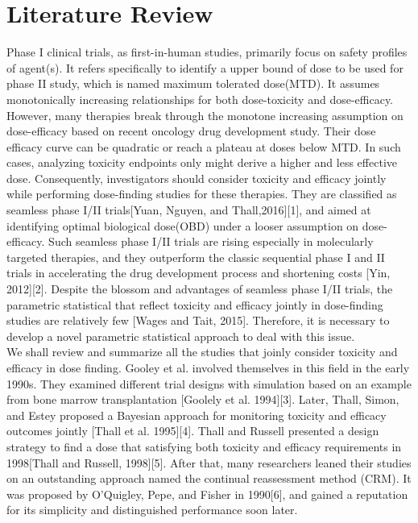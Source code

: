 \documentclass[12pt]{article}
\begin{document}
\section{Literature Review}
Phase I clinical trials, as first-in-human studies, primarily focus on safety profiles of agent(s). It refers specifically to identify a upper bound of dose to be used for phase II study, which is named maximum tolerated dose(MTD). It assumes monotonically increasing relationships for both dose-toxicity and dose-efficacy. However, many therapies break through the monotone increasing assumption on dose-efficacy based on recent oncology drug development study. Their dose efficacy curve can be quadratic or reach a plateau at doses below MTD. In such cases, analyzing toxicity endpoints only might derive a higher and less effective dose. Consequently, investigators should consider toxicity and efficacy jointly while performing dose-finding studies for these therapies. They are classified as seamless phase I/II trials[Yuan, Nguyen, and Thall,2016][1], and aimed at identifying optimal biological dose(OBD) under a looser assumption on dose-efficacy. Such seamless phase I/II trials are rising especially in molecularly targeted therapies, and they outperform the classic sequential phase I and II trials in accelerating the drug development process and shortening costs [Yin, 2012][2]. Despite the blossom and advantages of seamless phase I/II trials, the parametric statistical that reflect toxicity and efficacy jointly in dose-finding studies are relatively few [Wages and Tait, 2015]. Therefore, it is necessary to develop a novel parametric statistical approach to deal with this issue.\\
 We shall review and summarize all the studies that joinly consider toxicity and efficacy in dose finding. Gooley et al. involved themselves in this field in the early 1990s. They examined different trial designs with simulation based on an example from bone marrow transplantation [Goolely et al. 1994][3]. Later, Thall, Simon, and Estey proposed a Bayesian approach for monitoring toxicity and efficacy outcomes jointly [Thall et al. 1995][4]. Thall and Russell presented a design strategy to find a dose that satisfying both toxicity and efficacy requirements in 1998[Thall and Russell, 1998][5]. After that, many researchers leaned their studies on an outstanding approach named the continual reassessment method (CRM). It was proposed by O'Quigley, Pepe, and Fisher in 1990[6], and gained a reputation for its simplicity and distinguished performance soon later. \\
\end{document}
